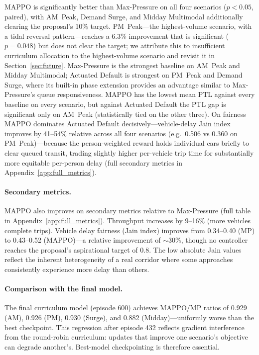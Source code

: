 \documentclass{article}
\begin{document}
MAPPO is significantly better than Max-Pressure on all four scenarios ($p<0.05$, paired), with AM~Peak, Demand Surge, and Midday Multimodal additionally clearing the proposal's 10\% target. PM~Peak---the highest-volume scenario, with a tidal reversal pattern---reaches a 6.3\% improvement that is significant ($p\!=\!0.048$) but does not clear the target; we attribute this to insufficient curriculum allocation to the highest-volume scenario and revisit it in Section~\ref{sec:future}. Max-Pressure is the strongest baseline on AM~Peak and Midday Multimodal; Actuated Default is strongest on PM~Peak and Demand Surge, where its built-in phase extension provides an advantage similar to Max-Pressure's queue responsiveness. MAPPO has the lowest mean PTL against every baseline on every scenario, but against Actuated Default the PTL gap is significant only on AM~Peak (statistically tied on the other three). On fairness MAPPO dominates Actuated Default decisively---vehicle-delay Jain index improves by 41--54\% relative across all four scenarios (e.g.\ 0.506 vs 0.360 on PM~Peak)---because the person-weighted reward holds individual cars briefly to clear queued transit, trading slightly higher per-vehicle trip time for substantially more equitable per-person delay (full secondary metrics in Appendix~\ref{app:full_metrics}).

\paragraph{Secondary metrics.}
MAPPO also improves on secondary metrics relative to Max-Pressure (full table in Appendix~\ref{app:full_metrics}). Throughput increases by 9--16\% (more vehicles complete trips). Vehicle delay fairness (Jain index) improves from 0.34--0.40 (MP) to 0.43--0.52 (MAPPO)---a relative improvement of ${\sim}$30\%, though no controller reaches the proposal's aspirational target of 0.8. The low absolute Jain values reflect the inherent heterogeneity of a real corridor where some approaches consistently experience more delay than others.

\paragraph{Comparison with the final model.}
The final curriculum model (episode 600) achieves MAPPO/MP ratios of 0.929 (AM), 0.926 (PM), 0.930 (Surge), and 0.882 (Midday)---uniformly worse than the best checkpoint. This regression after episode 432 reflects gradient interference from the round-robin curriculum: updates that improve one scenario's objective can degrade another's. Best-model checkpointing is therefore essential.
\end{document}
